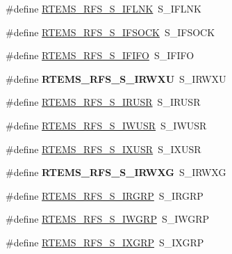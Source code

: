 \begin{DoxyCompactItemize}
\item 
\#define \mbox{\hyperlink{rtems-rfs-inode_8h_a081a7f768c9648fa065f3d5984003e1a}{R\+T\+E\+M\+S\+\_\+\+R\+F\+S\+\_\+\+S\+\_\+\+I\+F\+L\+NK}}~S\+\_\+\+I\+F\+L\+NK
\item 
\#define \mbox{\hyperlink{rtems-rfs-inode_8h_ac45241b46a62fa8feca8dc669ded7ac8}{R\+T\+E\+M\+S\+\_\+\+R\+F\+S\+\_\+\+S\+\_\+\+I\+F\+S\+O\+CK}}~S\+\_\+\+I\+F\+S\+O\+CK
\item 
\#define \mbox{\hyperlink{rtems-rfs-inode_8h_ae81718f210721406b755262bb88c37b3}{R\+T\+E\+M\+S\+\_\+\+R\+F\+S\+\_\+\+S\+\_\+\+I\+F\+I\+FO}}~S\+\_\+\+I\+F\+I\+FO
\item 
\mbox{\label{rtems-rfs-inode_8h_aac2ab35bd252802fadc5b1c009a882d7}} 
\#define {\bfseries R\+T\+E\+M\+S\+\_\+\+R\+F\+S\+\_\+\+S\+\_\+\+I\+R\+W\+XU}~S\+\_\+\+I\+R\+W\+XU
\item 
\#define \mbox{\hyperlink{rtems-rfs-inode_8h_a8c4607da517aeb8f3efdb5e1fadc6ca8}{R\+T\+E\+M\+S\+\_\+\+R\+F\+S\+\_\+\+S\+\_\+\+I\+R\+U\+SR}}~S\+\_\+\+I\+R\+U\+SR
\item 
\#define \mbox{\hyperlink{rtems-rfs-inode_8h_afbce64d5edc5785669cad161c0381d04}{R\+T\+E\+M\+S\+\_\+\+R\+F\+S\+\_\+\+S\+\_\+\+I\+W\+U\+SR}}~S\+\_\+\+I\+W\+U\+SR
\item 
\#define \mbox{\hyperlink{rtems-rfs-inode_8h_ac350201bf9b38054f65fcd4785d6a5a0}{R\+T\+E\+M\+S\+\_\+\+R\+F\+S\+\_\+\+S\+\_\+\+I\+X\+U\+SR}}~S\+\_\+\+I\+X\+U\+SR
\item 
\mbox{\label{rtems-rfs-inode_8h_ac70ab1e0eb41950f46424a03f15d9b03}} 
\#define {\bfseries R\+T\+E\+M\+S\+\_\+\+R\+F\+S\+\_\+\+S\+\_\+\+I\+R\+W\+XG}~S\+\_\+\+I\+R\+W\+XG
\item 
\#define \mbox{\hyperlink{rtems-rfs-inode_8h_aa52a7db3f713c15c552bfa17dd7ef215}{R\+T\+E\+M\+S\+\_\+\+R\+F\+S\+\_\+\+S\+\_\+\+I\+R\+G\+RP}}~S\+\_\+\+I\+R\+G\+RP
\item 
\#define \mbox{\hyperlink{rtems-rfs-inode_8h_a898f7dec2aa6906b7ad567d003038052}{R\+T\+E\+M\+S\+\_\+\+R\+F\+S\+\_\+\+S\+\_\+\+I\+W\+G\+RP}}~S\+\_\+\+I\+W\+G\+RP
\item 
\#define \mbox{\hyperlink{rtems-rfs-inode_8h_ab7a0e4277988530b4049c81d8f1991fe}{R\+T\+E\+M\+S\+\_\+\+R\+F\+S\+\_\+\+S\+\_\+\+I\+X\+G\+RP}}~S\+\_\+\+I\+X\+G\+RP
\item 
\mbox{\label{rtems-rfs-inode_8h_a2dac3937b0dc737a8ad676b1a8562a72}} 

\end{DoxyCompactItemize}
